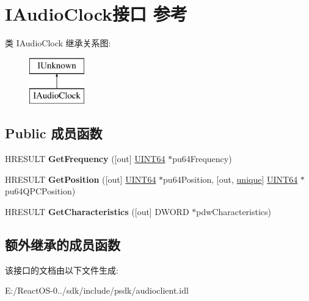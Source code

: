 \hypertarget{interface_i_audio_clock}{}\section{I\+Audio\+Clock接口 参考}
\label{interface_i_audio_clock}
类 I\+Audio\+Clock 继承关系图\+:\begin{figure}[H]
\begin{center}
\leavevmode
\includegraphics[height=2.000000cm]{interface_i_audio_clock}
\end{center}
\end{figure}
\subsection*{Public 成员函数}
\begin{DoxyCompactItemize}
\item 
\mbox{\label{interface_i_audio_clock_a868d136871742a9b91ac91fc24f5a4a4}} 
H\+R\+E\+S\+U\+LT {\bfseries Get\+Frequency} (\mbox{[}out\mbox{]} \hyperlink{_processor_bind_8h_a57be03562867144161c1bfee95ca8f7c}{U\+I\+N\+T64} $\ast$pu64\+Frequency)
\item 
\mbox{\label{interface_i_audio_clock_abefa6273d9e322f0ac37c22818ddb99b}} 
H\+R\+E\+S\+U\+LT {\bfseries Get\+Position} (\mbox{[}out\mbox{]} \hyperlink{_processor_bind_8h_a57be03562867144161c1bfee95ca8f7c}{U\+I\+N\+T64} $\ast$pu64\+Position, \mbox{[}out, \hyperlink{interfaceunique}{unique}\mbox{]} \hyperlink{_processor_bind_8h_a57be03562867144161c1bfee95ca8f7c}{U\+I\+N\+T64} $\ast$pu64\+Q\+P\+C\+Position)
\item 
\mbox{\label{interface_i_audio_clock_af95cdaa90f02a13c2e891418a3e13718}} 
H\+R\+E\+S\+U\+LT {\bfseries Get\+Characteristics} (\mbox{[}out\mbox{]} D\+W\+O\+RD $\ast$pdw\+Characteristics)
\end{DoxyCompactItemize}
\subsection*{额外继承的成员函数}


该接口的文档由以下文件生成\+:\begin{DoxyCompactItemize}
\item 
E\+:/\+React\+O\+S-\/0../sdk/include/psdk/audioclient.\+idl\end{DoxyCompactItemize}
